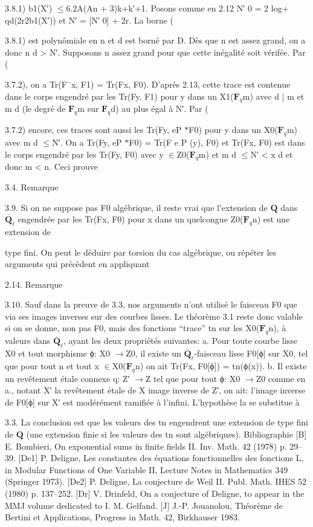 \documentclass[11pt]{article}
\begin{document}
3.8.1) b1(X′) \(\le\)6.2A(An + 3)k+k′+1. Posons comme en 2.12 N′ 0 = 2 log+ qd(2r2b1(X′)) et N′ = [N′ 0] + 2r. La borne (

3.8.1) est polynômiale en n et d est borné par D. Dès que n est assez grand, on a donc n d > N′. Supposons n assez grand pour que cette inégalité soit vérifée. Par (

3.7.2), on a Tr(F¯x, F1) = Tr(Fx, F0). D’après 2.13, cette trace est contenue dans le corps engendré par les Tr(Fy, F1) pour y dans un X1(\(\mathbf F_q\)m) avec d | m et m d (le degré de \(\mathbf F_q\)m sur \(\mathbf F_q\)d) au plus égal à N′. Par (

3.7.2) encore, ces traces sont aussi les Tr(Fy, eP \(*\)F0) pour y dans un X0(\(\mathbf F_q\)m) avec m d \(\le\)N′. On a Tr(Fy, eP \(*\)F0) = Tr(F e P (y), F0) et Tr(Fx, F0) est dans le corps engendré par les Tr(Fy, F0) avec y \(\in\)Z0(\(\mathbf F_q\)m) et m d \(\le\)N′ < x d et donc m < n. Ceci prouve 

3.4. Remarque 

3.9. Si on ne suppose pas F0 algébrique, il reste vrai que l’extension de \(\mathbf Q\) dans \(\overline{\mathbf Q}_\ell\) engendrée par les Tr(Fx, F0) pour x dans un quelcongue Z0(\(\mathbf F_q\)n) est une extension de

type fini. On peut le déduire par torsion du cas algébrique, ou répéter les arguments qui précèdent en appliquant 

2.14. Remarque 

3.10. Sauf dans la preuve de 3.3, nos arguments n’ont utilisé le faisceau F0 que via ses images inverses sur des courbes lisses. Le théorème 3.1 reste donc valable si on se donne, non pas F0, mais des fonctions “trace” tn sur les X0(\(\mathbf F_q\)n), à valeurs dans \(\overline{\mathbf Q}_\ell\), ayant les deux propriétés suivantes: a. Pour toute courbe lisse X0 et tout morphisme ϕ: X0 \(\to\)Z0, il existe un \(\overline{\mathbf Q}_\ell\)-faisceau lisse F0[ϕ] sur X0, tel que pour tout n et tout x \(\in\)X0(\(\mathbf F_q\)n) on ait Tr(Fx, F0[ϕ]) = tn(ϕ(x)). b. Il existe un revêtement étale connexe q: Z′ \(\to\)Z tel que pour tout ϕ: X0 \(\to\)Z0 comme en a., notant X′ la revêtement étale de X image inverse de Z′, on ait: l’image inverse de F0[ϕ] sur X′ est modérément ramifiée à l’infini. L’hypothèse la se substitue à 

3.3. La conclusion est que les valeurs des tn engendrent une extension de type fini de \(\mathbf Q\) (une extension finie si les valeurs des tn sont algébriques). Bibliographie [B] E. Bombieri, On exponential sums in finite fields II. Inv. Math. 42 (1978) p. 29--39. [De1] P. Deligne, Les constantes des équations fonctionnelles des fonctions L, in Modular Functions of One Variable II, Lecture Notes in Mathematics 349 (Springer 1973). [De2] P. Deligne, La conjecture de Weil II. Publ. Math. IHES 52 (1980) p. 137--252. [Dr] V. Drinfeld, On a conjecture of Deligne, to appear in the MMJ volume dedicated to I. M. Gelfand. [J] J.-P. Jouanolou, Théorème de Bertini et Applications, Progress in Math. 42, Birkhauser 1983.
\end{document}
